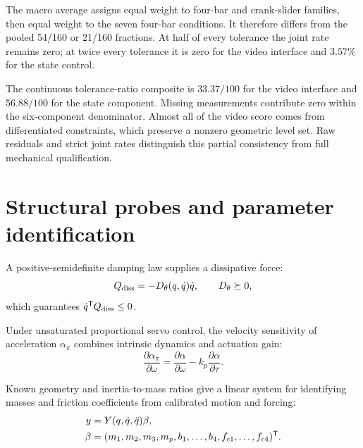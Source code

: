 \documentclass[10pt,twocolumn,letterpaper]{article}
\begin{document}
The macro average assigns equal weight to four-bar and crank-slider families, then equal weight to the seven four-bar conditions. It therefore differs from the pooled 54/160 or 21/160 fractions. At half of every tolerance the joint rate remains zero; at twice every tolerance it is zero for the video interface and $3.57\%$ for the state control.

The continuous tolerance-ratio composite is $33.37/100$ for the video interface and $56.88/100$ for the state component. Missing measurements contribute zero within the six-component denominator. Almost all of the video score comes from differentiated constraints, which preserve a nonzero geometric level set. Raw residuals and strict joint rates distinguish this partial consistency from full mechanical qualification.

\section{Structural probes and parameter identification}
\label{app:probes}
A positive-semidefinite damping law supplies a dissipative force:
\begin{equation}
Q_{\rm diss}=-D_\theta(q,\dot q)\dot q,\qquad D_\theta\succeq0,
\label{eq:design-dissipation}
\end{equation}
which guarantees $\dot q^{\mathsf T} Q_{\rm diss}\leq0$.

Under unsaturated proportional servo control, the velocity sensitivity of acceleration $\alpha_\pi$ combines intrinsic dynamics and actuation gain:
\begin{equation}
\frac{\partial\alpha_\pi}{\partial\omega}
=\frac{\partial\alpha}{\partial\omega}
-k_p\frac{\partial\alpha}{\partial\tau}.
\label{eq:controller-confound}
\end{equation}

Known geometry and inertia-to-mass ratios give a linear system for identifying masses and friction coefficients from calibrated motion and forcing:
\begin{equation}
\begin{aligned}
y&=Y(q,\dot q,\ddot q)\beta,\\
\beta&=(m_1,m_2,m_3,m_p,b_1,\ldots,b_4,f_{c1},\ldots,f_{c4})^{\mathsf T}.
\end{aligned}
\label{eq:identification}
\end{equation}
\end{document}
